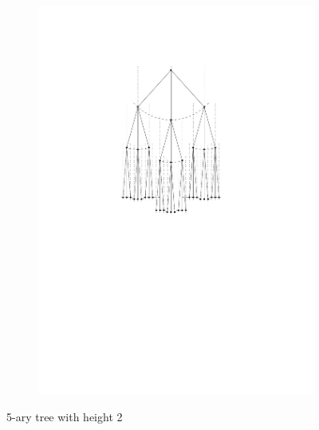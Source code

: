 \begin{figure}[H]
	\centering
	\begin{subfigure}{\textwidth}
		\centering
		\includegraphics[page=2,width=0.8\linewidth]{graphics/k-ary_tree_example_drawings.pdf}
	\end{subfigure}
	\caption{5-ary tree with height 2}\label{im:4-ary_tree}
\end{figure}
